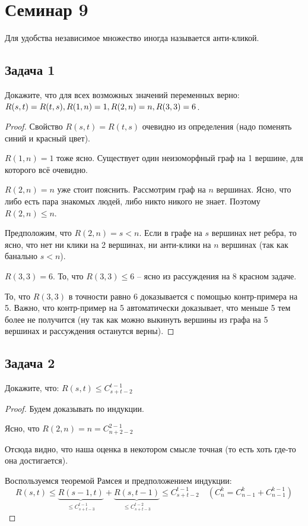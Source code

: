 
\section{Семинар 9}

Для удобства независимое множество иногда называется анти-кликой.

\subsection{Задача 1}

Докажите, что для всех возможных значений переменных верно: $R(s,t) = R(t,s), \\
R(1,n) = 1, R(2,n) = n, R(3,3) = 6$.

\begin{proof}
Свойство $R(s,t) = R(t,s)$ очевидно из определения (надо поменять синий и красный цвет).

$R(1,n) = 1$ тоже ясно. Существует один неизоморфный граф на 1 вершине, для которого всё очевидно.

$R(2,n) = n$ уже стоит пояснить. Рассмотрим граф на $n$ вершинах. Ясно, что либо есть пара знакомых людей, либо никто никого не знает. Поэтому $R(2,n) \leq n$.

Предположим, что $R(2,n) = s < n$. Если в графе на $s$ вершинах нет ребра, то ясно, что нет ни клики на 2 вершинах, ни анти-клики на $n$ вершинах (так как банально $s < n$).

$R(3, 3) = 6$. То, что $R(3, 3) \leq 6$ -- ясно из рассуждения на 8 красном задаче.

То, что $R(3, 3)$ в точности равно 6 доказывается с помощью контр-примера на 5. Важно, что контр-пример на 5 автоматически доказывает, что меньше 5 тем более не получится (ну так как можно выкинуть вершины из графа на 5 вершинах и рассуждения останутся верны).
\end{proof}

\subsection{Задача 2}

Докажите, что: $\displaystyle R(s, t) \leq C^{t-1}_{s+t-2}$

\begin{proof}
Будем доказывать по индукции. 

Ясно, что $R(2,n) = n = C^{2-1}_{n+2-2}$

Отсюда видно, что наша оценка в некотором смысле точная (то есть хоть где-то она достигается).

Воспользуемся теоремой Рамсея и предположением индукции:
\[
R(s, t) \leq \underbrace{R(s-1,t)}_{\leq C^{t-1}_{s+t-3}} + \underbrace{R(s, t-1)}_{\leq C^{t-2}_{s+t-3}} \leq C^{t-1}_{s+t-2} \quad (C^k_n = C^k_{n-1} + C^{k-1}_{n-1})
\]
\end{proof}

